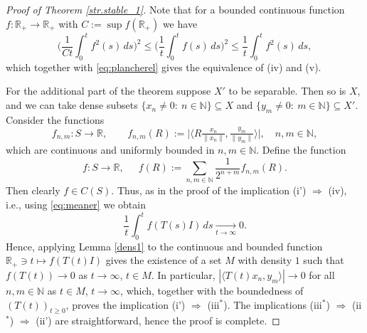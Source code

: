 \documentclass[11pt,intlimits, draft,oneside]{amsart}
\theoremstyle{definition}
\def\dd{\,d}
\def\RR{\mathbb{R}}
\def\NN{\mathbb{N}}
\begin{document}
\begin{proof}[Proof of Theorem \ref{str.stable_1}]
\noindent Note that for a bounded continuous function $f:\RR_+ \to
\RR_+$ with $C:=\sup f(\RR_+)$ we have
%
\begin{equation*}
\biggl(\frac{1}{Ct} \int_0^t f^2(s)\dd s\biggr)^2 \leq \biggl(
\frac{1}{t} \int_0^t f(s)\dd s \biggr)^2 \leq \frac{1}{t} \int_0^t
f^2(s)\dd s,
\end{equation*}
which together with \eqref{eq:plancherel} gives the equivalence of
(iv) and (v).

\smallskip

For the additional part of the theorem suppose $X'$ to be separable.
Then so is $X$, and we can take dense subsets $\{x_n\neq 0:\
n\in\NN\}\subseteq X$ and $\{y_m\neq 0:\ m\in\NN\}\subseteq X'$.
Consider the functions
\begin{equation*}
 f_{n,m}:S\to\RR,\qquad f_{n,m}(R):=\bigl|\bigl\langle R \tfrac{x_n}{\|x_n\|},\tfrac{y_m}{\|y_m\|}\bigr\rangle \bigr|,\quad n,m\in \NN,
\end{equation*}
which are continuous and uniformly bounded in $n,m\in\NN$. Define
the function
\begin{equation*}
f:S\to\RR, \quad \ \
f(R):=\sum_{n,m\in\NN}\frac{1}{2^{n+m}}f_{n,m}(R).
\end{equation*}
%
Then clearly $f\in C(S)$. Thus, as in the proof of the implication
(i') $\Rightarrow$ (iv), i.e., using \eqref{eq:meaner} we obtain
\begin{equation*}
\frac{1}{t}\int_{0}^t f(T(s)I)\dd s
\underset{{t\to\infty}}{\longrightarrow} 0.
\end{equation*}
Hence, applying Lemma \ref{dens1} to the continuous and bounded
function $\RR_+\ni t \mapsto f(T(t)I)$ gives the existence of a set
$M$ with density $1$ such that $f(T(t))\to 0$ as $t\to \infty$,
$t\in M$. In particular, $|\langle T(t)x_n,y_m\rangle|\to 0$ for all
$n,m\in\NN$ as $t\in M$, $t\to\infty$, which, together with the
boundedness of $(T(t))_{t\geq 0}$, proves the implication (i')
$\Rightarrow$ (iii$^*$). The implications (iii$^*$) $\Rightarrow$
(ii$^*$) $\Rightarrow$ (ii') are straightforward, hence the proof is
complete.
\end{proof}
%
\end{document}
